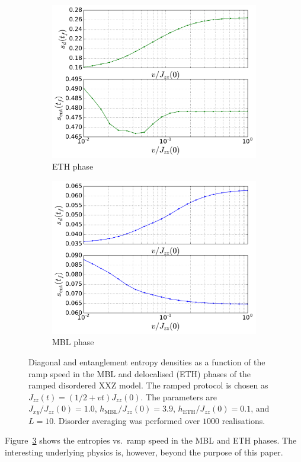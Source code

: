 \documentclass{SciPost}
\newcommand\0{\scalebox{-1}[1]{0}}
\begin{document}
\begin{figure}[t!]
	\centering
	\begin{subfigure}[b]{0.496\textwidth}
		\includegraphics[width=\textwidth]{example1_ETH.pdf}
		\caption{ETH phase}
		\label{fig:gull}
	\end{subfigure}
	\begin{subfigure}[b]{0.496\textwidth}
		\includegraphics[width=\textwidth]{example1_MBL.pdf}
		\caption{MBL phase}
		\label{fig:tiger}
	\end{subfigure}
	\caption{\label{fig:example1} Diagonal and entanglement entropy densities as a function of the ramp speed in the MBL and delocalised (ETH) phases of the ramped disordered XXZ model. The ramped protocol is chosen as $J_{zz}(t) = (1/2 + vt)J_{zz}(0)$. The parameters are $J_{xy}/J_{zz}(0)=1.0$, $h_\mathrm{MBL}/J_{zz}(0)=3.9$, $h_\mathrm{ETH}/J_{zz}(0)=0.1$, and $L=10$. Disorder averaging was performed over $1000$ realisations.}  
\end{figure}
Figure~\ref{fig:example1} shows the entropies vs.~ramp speed in the MBL and ETH phases. The interesting underlying physics is, however, beyond the purpose of this paper.
\end{document}
